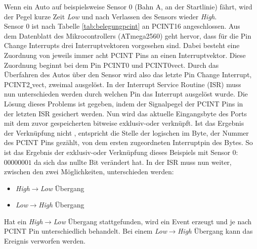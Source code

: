 \documentclass[a4paper, 11pt]{report}
\begin{document}
			Wenn ein Auto auf beispielsweise Sensor 0 (Bahn A, an der Startlinie) fährt, wird der Pegel kurze Zeit \emph{Low} und nach Verlassen des Sensors wieder \emph{High}.\\ Sensor 0 ist nach Tabelle \ref{tab:belegungpcint} an PCINT16 angeschlossen. 
			Aus dem Datenblatt des Mikrocontrollers (ATmega2560) geht hervor, dass für die Pin Change Interrupts drei Interruptvektoren vorgesehen sind. 
			Dabei besteht eine Zuordnung von jeweils immer acht PCINT Pins an einen Interruptvektor. 
			Diese Zuordnung beginnt bei dem Pin PCINT0 und PCINT0\underline{}vect. 
			Durch das Überfahren des Autos über den Sensor wird also das letzte Pin Change Interrupt, PCINT2\underline{ }vect, zweimal ausgelöst. 
			In der Interrupt Service Routine (ISR) muss nun unterschieden werden durch welchen Pin das Interrupt ausgelöst wurde.
			Die Lösung dieses Problems ist gegeben, indem der Signalpegel der PCINT Pins in der letzten ISR gesichert werden. Nun wird das aktuelle Eingangsbyte des Ports mit dem zuvor gespeicherten bitweise exklusiv-oder verknüpft.
			Ist das Ergebnis der Verknüpfung nicht \grqq, entspricht die Stelle der logischen \grqq im Byte, der Nummer des PCINT Pins gezählt, von dem ersten zugeordneten Interruptpin des Bytes. 
			So ist das Ergebnis der exklusiv-oder Verknüpfung dieses Beispiels mit Sensor 0: $00000001$ da sich das nullte Bit verändert hat.
			In der ISR muss nun weiter, zwischen den zwei Möglichkeiten, unterschieden werden:
				\begin{itemize}
					\item \emph{High$\rightarrow$Low} Übergang
					\item \emph{Low$\rightarrow$High} Übergang
				\end{itemize}
			Hat ein \emph{High$\rightarrow$Low} Übergang stattgefunden, wird ein Event erzeugt und je nach PCINT Pin unterschiedlich behandelt.
			Bei einem \emph{Low$\rightarrow$High} Übergang kann das Ereignis verworfen werden.
\end{document}
